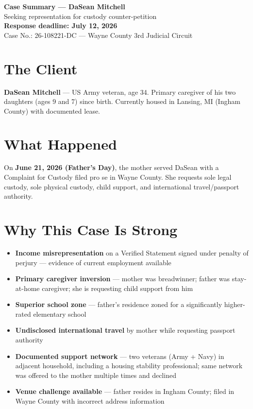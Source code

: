 \documentclass[10.5pt,letterpaper]{article}
\begin{document}
\begin{center}
{\LARGE\bfseries Case Summary --- DaSean Mitchell}\\[0.3em]
{\large Seeking representation for custody counter-petition}\\[0.2em]
{\large\bfseries Response deadline: July 12, 2026}\\[0.1em]
{Case No.: 26-108221-DC --- Wayne County 3rd Judicial Circuit}
\end{center}

\section{The Client}

\textbf{DaSean Mitchell} --- US Army veteran, age 34. Primary caregiver of his two daughters (ages 9 and 7) since birth. Currently housed in Lansing, MI (Ingham County) with documented lease.

\section{What Happened}

On \textbf{June 21, 2026 (Father's Day)}, the mother served DaSean with a Complaint for Custody filed pro se in Wayne County. She requests sole legal custody, sole physical custody, child support, and international travel/passport authority.

\section{Why This Case Is Strong}

\begin{itemize}
\item \textbf{Income misrepresentation} on a Verified Statement signed under penalty of perjury --- evidence of current employment available
\item \textbf{Primary caregiver inversion} --- mother was breadwinner; father was stay-at-home caregiver; she is requesting child support from him
\item \textbf{Superior school zone} --- father's residence zoned for a significantly higher-rated elementary school
\item \textbf{Undisclosed international travel} by mother while requesting passport authority
\item \textbf{Documented support network} --- two veterans (Army + Navy) in adjacent household, including a housing stability professional; same network was offered to the mother multiple times and declined
\item \textbf{Venue challenge available} --- father resides in Ingham County; filed in Wayne County with incorrect address information
\end{itemize}
\end{document}
